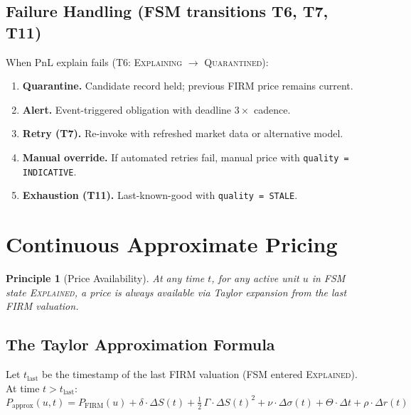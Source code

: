 \documentclass[11pt,a4paper]{article}
\newtheorem{principle}[definition]{Principle}
\begin{document}
\subsection{Failure Handling (FSM transitions T6, T7, T11)}

When PnL explain fails (T6: \textsc{Explaining} $\to$ \textsc{Quarantined}):
\begin{enumerate}
\item \textbf{Quarantine.}  Candidate record held; previous FIRM price remains current.
\item \textbf{Alert.}  Event-triggered obligation with deadline $3\times$ cadence.
\item \textbf{Retry (T7).}  Re-invoke with refreshed market data or alternative model.
\item \textbf{Manual override.}  If automated retries fail, manual price with \texttt{quality = INDICATIVE}.
\item \textbf{Exhaustion (T11).}  Last-known-good with \texttt{quality = STALE}.
\end{enumerate}

\clearpage
\section{Continuous Approximate Pricing}
\label{sec:approx-pricing}

\begin{principle}[Price Availability]
\label{princ:price-availability}
At any time $t$, for any active unit $u$ in FSM state \textsc{Explained}, a price is always available via Taylor expansion from the last FIRM valuation.
\end{principle}

\subsection{The Taylor Approximation Formula}

Let $t_{\mathrm{last}}$ be the timestamp of the last FIRM valuation (FSM entered \textsc{Explained}).  At time $t > t_{\mathrm{last}}$:
\begin{equation}
\label{eq:taylor-approx}
\boxed{
P_{\mathrm{approx}}(u, t) = P_{\mathrm{FIRM}}(u) + \delta \cdot \Delta S(t) + \tfrac{1}{2}\,\Gamma \cdot \Delta S(t)^2 + \nu \cdot \Delta\sigma(t) + \Theta \cdot \Delta t + \rho \cdot \Delta r(t)
}
\end{equation}
\end{document}

